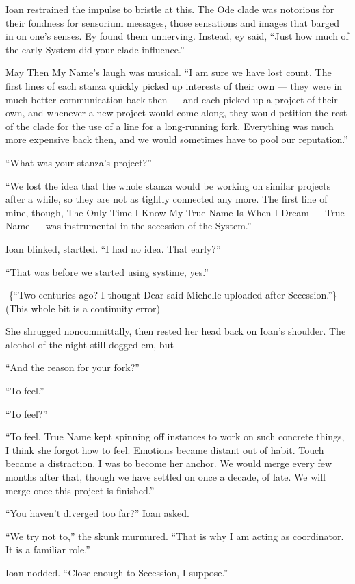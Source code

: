 Ioan restrained the impulse to bristle at this. The Ode clade was notorious for their fondness for sensorium messages, those sensations and images that barged in on one's senses. Ey found them unnerving. Instead, ey said, ``Just how much of the early System did your clade influence.''

May Then My Name's laugh was musical. ``I am sure we have lost count. The first lines of each stanza quickly picked up interests of their own — they were in much better communication back then — and each picked up a project of their own, and whenever a new project would come along, they would petition the rest of the clade for the use of a line for a long-running fork. Everything was much more expensive back then, and we would sometimes have to pool our reputation.''

``What was your stanza's project?''

``We lost the idea that the whole stanza would be working on similar projects after a while, so they are not as tightly connected any more. The first line of mine, though, The Only Time I Know My True Name Is When I Dream — True Name — was instrumental in the secession of the System.''

Ioan blinked, startled. ``I had no idea. That early?''

``That was before we started using systime, yes.''

-\{``Two centuries ago? I thought Dear said Michelle uploaded after Secession.''\}(This whole bit is a continuity error)

She shrugged noncommittally, then rested her head back on Ioan's shoulder. The alcohol of the night still dogged em, but

``And the reason for your fork?''

``To feel.''

``To feel?''

``To feel. True Name kept spinning off instances to work on such concrete things, I think she forgot how to feel. Emotions became distant out of habit. Touch became a distraction. I was to become her anchor. We would merge every few months after that, though we have settled on once a decade, of late. We will merge once this project is finished.''

``You haven't diverged too far?'' Ioan asked.

``We try not to,'' the skunk murmured. ``That is why I am acting as coordinator. It is a familiar role.''

Ioan nodded. ``Close enough to Secession, I suppose.''

